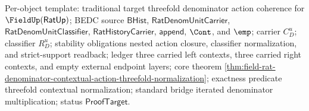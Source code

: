 Per-object template: traditional target threefold denominator action coherence
for $\FieldUp(\mathsf{RatUp})$; BEDC source $\mathsf{BHist}$,
$\mathsf{RatDenomUnitCarrier}$, $\mathsf{RatDenomUnitClassifier}$,
$\mathsf{RatHistoryCarrier}$, $\mathsf{append}$, $\Cont$, and $\emp$; carrier
$C_D^u$; classifier $R_D^u$; stability obligations nested action closure,
classifier normalization, and strict-support readback; ledger three carried
left contexts, three carried right contexts, and empty external endpoint
layers; core theorem
\autoref{thm:field-rat-denominator-contextual-action-threefold-normalization};
exactness predicate threefold contextual normalization; standard bridge
iterated denominator multiplication; status $\mathsf{ProofTarget}$.
